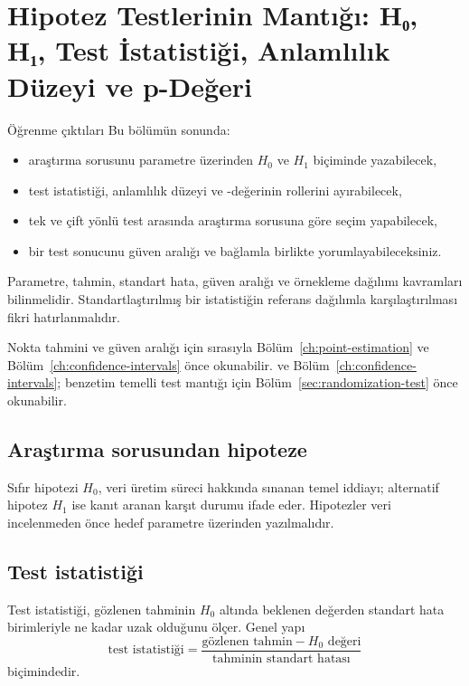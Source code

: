 \chapter{Hipotez Testlerinin Mantığı: H₀, H₁, Test İstatistiği, Anlamlılık Düzeyi ve p-Değeri}
\label{ch:hypothesis}

\begin{prismbox}[PrismLight]{Öğrenme çıktıları}
Bu bölümün sonunda:
\begin{itemize}
  \item araştırma sorusunu parametre üzerinden $H_0$ ve $H_1$ biçiminde yazabilecek,
  \item test istatistiği, anlamlılık düzeyi ve \pval-değerinin rollerini ayırabilecek,
  \item tek ve çift yönlü test arasında araştırma sorusuna göre seçim yapabilecek,
  \item bir test sonucunu güven aralığı ve bağlamla birlikte yorumlayabileceksiniz.
\end{itemize}
\end{prismbox}

\begin{prerequisitebox}
Parametre, tahmin, standart hata, güven aralığı ve örnekleme dağılımı
kavramları bilinmelidir. Standartlaştırılmış bir istatistiğin referans
dağılımla karşılaştırılması fikri hatırlanmalıdır.
\end{prerequisitebox}

Nokta tahmini ve güven aralığı için sırasıyla Bölüm~\ref{ch:point-estimation}
\ifimoders
ve Bölüm~\ref{ch:confidence-intervals} önce okunabilir.
\else
ve Bölüm~\ref{ch:confidence-intervals}; benzetim temelli test mantığı için
Bölüm~\ref{sec:randomization-test} önce okunabilir.
\fi

\section{Araştırma sorusundan hipoteze}
\label{sec:hypotheses}

Sıfır hipotezi $H_0$, veri üretim süreci hakkında sınanan temel iddiayı;
alternatif hipotez $H_1$ ise kanıt aranan karşıt durumu ifade eder.
Hipotezler veri incelenmeden önce hedef parametre üzerinden yazılmalıdır.

\section{Test istatistiği}

Test istatistiği, gözlenen tahminin $H_0$ altında beklenen değerden standart
hata birimleriyle ne kadar uzak olduğunu ölçer. Genel yapı
\[
\text{test istatistiği}=
\frac{\text{gözlenen tahmin}-\text{$H_0$ değeri}}
{\text{tahminin standart hatası}}
\]
biçimindedir.

